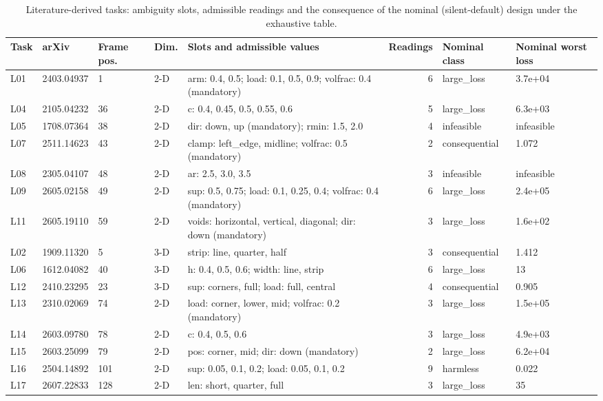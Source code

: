 \begin{table}[t]
\centering\small
\caption{Literature-derived tasks: ambiguity slots, admissible readings and the consequence of the nominal (silent-default) design under the exhaustive table.}
\label{tab:tab_tasks}
\begin{tabular}{lllllrll}
\toprule
Task & arXiv & Frame pos. & Dim. & Slots and admissible values & Readings & Nominal class & Nominal worst loss \\
\midrule
L01 & 2403.04937 & 1 & 2-D & arm: 0.4, 0.5; load: 0.1, 0.5, 0.9; volfrac: 0.4 (mandatory) & 6 & large\_loss & 3.7e+04 \\
L04 & 2105.04232 & 36 & 2-D & c: 0.4, 0.45, 0.5, 0.55, 0.6 & 5 & large\_loss & 6.3e+03 \\
L05 & 1708.07364 & 38 & 2-D & dir: down, up (mandatory); rmin: 1.5, 2.0 & 4 & infeasible & infeasible \\
L07 & 2511.14623 & 43 & 2-D & clamp: left\_edge, midline; volfrac: 0.5 (mandatory) & 2 & consequential & 1.072 \\
L08 & 2305.04107 & 48 & 2-D & ar: 2.5, 3.0, 3.5 & 3 & infeasible & infeasible \\
L09 & 2605.02158 & 49 & 2-D & sup: 0.5, 0.75; load: 0.1, 0.25, 0.4; volfrac: 0.4 (mandatory) & 6 & large\_loss & 2.4e+05 \\
L11 & 2605.19110 & 59 & 2-D & voids: horizontal, vertical, diagonal; dir: down (mandatory) & 3 & large\_loss & 1.6e+02 \\
L02 & 1909.11320 & 5 & 3-D & strip: line, quarter, half & 3 & consequential & 1.412 \\
L06 & 1612.04082 & 40 & 3-D & h: 0.4, 0.5, 0.6; width: line, strip & 6 & large\_loss & 13 \\
L12 & 2410.23295 & 23 & 3-D & sup: corners, full; load: full, central & 4 & consequential & 0.905 \\
L13 & 2310.02069 & 74 & 2-D & load: corner, lower, mid; volfrac: 0.2 (mandatory) & 3 & large\_loss & 1.5e+05 \\
L14 & 2603.09780 & 78 & 2-D & c: 0.4, 0.5, 0.6 & 3 & large\_loss & 4.9e+03 \\
L15 & 2603.25099 & 79 & 2-D & pos: corner, mid; dir: down (mandatory) & 2 & large\_loss & 6.2e+04 \\
L16 & 2504.14892 & 101 & 2-D & sup: 0.05, 0.1, 0.2; load: 0.05, 0.1, 0.2 & 9 & harmless & 0.022 \\
L17 & 2607.22833 & 128 & 2-D & len: short, quarter, full & 3 & large\_loss & 35 \\

\end{tabular}
\end{table}
